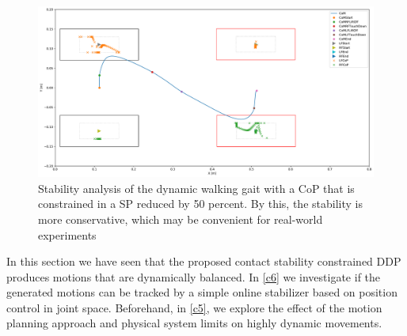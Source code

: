 \begin{figure}[h!]
\centering	
\includegraphics[width=.9\textwidth]{fig/walkDynamic/StabilityAnalysis_CoP50}
\caption[Dynamic walking stability analysis with conservative \gls{CoP} restriction]{Stability analysis of the dynamic walking gait with a \gls{CoP} that is constrained in a \gls{SP} reduced by 50 percent. By this, the stability is more conservative, which may be convenient for real-world experiments}
\label{fig:walkDynamic_StabilityCoP50}
\end{figure}

In this section we have seen that the proposed contact stability constrained DDP produces motions that are dynamically balanced. In \cref{c6} we investigate if the generated motions can be tracked by a simple online stabilizer based on position control in joint space. Beforehand, in \cref{c5}, we explore the effect of the motion planning approach and physical system limits on highly dynamic movements.
























